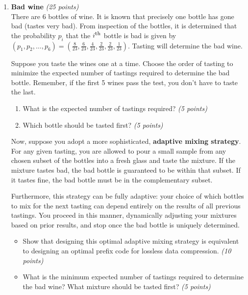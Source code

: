 \documentclass[12pt]{article}
\begin{document}
\begin{enumerate}
\begin{problem}
\end{problem}
\begin{problem}
\newpage
\end{problem}

\vskip 0.3in
\item {\bf Bad wine} {\it (25 points)}\\
There are 6 bottles of wine.
It is known that precisely one bottle has gone bad (tastes very bad).
From inspection of the bottles, it is determined that the probability $p_i$ that the $i^{\mbox{\footnotesize{th}}}$ bottle is bad is given by $(p_1, p_2, \ldots , p_6)=(\frac{8}{23}, \frac{6}{23}, \frac{4}{23}, \frac{2}{23}, \frac{2}{23}, \frac{1}{23})$.
Tasting will determine the bad wine.

Suppose you taste the wines one at a time.
Choose the order of tasting to minimize the expected number of tastings required to determine the bad bottle.
Remember, if the first 5 wines pass the test, you don't have to taste the last.

\begin{enumerate}
\item What is the expected number of tastings required? {\it (5 points)}
\item Which bottle should be tasted first? {\it (5 points)}
\end{enumerate}

Now, suppose you adopt a more sophisticated, \textbf{adaptive mixing strategy}. For any given tasting, you are allowed to pour a small sample from any chosen subset of the bottles into a fresh glass and taste the mixture. If the mixture tastes bad, the bad bottle is guaranteed to be within that subset. If it tastes fine, the bad bottle must be in the complementary subset. 

Furthermore, this strategy can be fully adaptive: your choice of which bottles to mix for the next tasting can depend entirely on the results of all previous tastings. You proceed in this manner, dynamically adjusting your mixtures based on prior results, and stop once the bad bottle is uniquely determined.

\begin{itemize}
\item[(c)] Show that designing this optimal adaptive mixing strategy is equivalent to designing an optimal prefix code for lossless data compression. {\it (10 points)}
\item[(d)] What is the minimum expected number of tastings required to determine the bad wine? What mixture should be tasted first? {\it (5 points)}
\end{itemize}





\end{enumerate}
\end{document}
